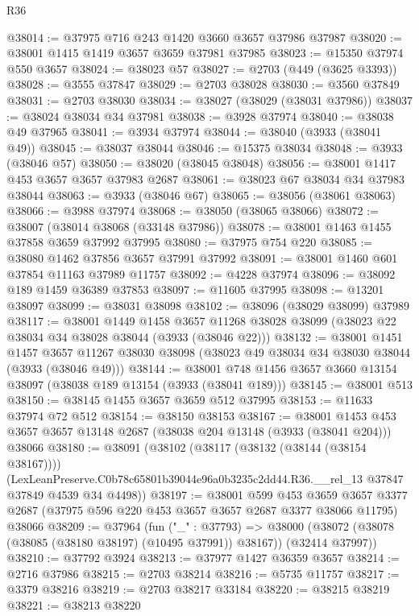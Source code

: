 \begin{lexlean}{R36}
\begin{coremodule}
@38014 := @37975 @716 @243 @1420 @3660 @3657 @37986 @37987
@38020 := @38001 @1415 @1419 @3657 @3659 @37981 @37985
@38023 := @15350 @37974 @550 @3657
@38024 := @38023 @57
@38027 := @2703 (@449 (@3625 @3393))
@38028 := @3555 @37847
@38029 := @2703 @38028
@38030 := @3560 @37849
@38031 := @2703 @38030
@38034 := @38027 (@38029 (@38031 @37986))
@38037 := @38024 @38034 @34 @37981
@38038 := @3928 @37974
@38040 := @38038 @49 @37965
@38041 := @3934 @37974
@38044 := @38040 (@3933 (@38041 @49))
@38045 := @38037 @38044
@38046 := @15375 @38034
@38048 := @3933 (@38046 @57)
@38050 := @38020 (@38045 @38048)
@38056 := @38001 @1417 @453 @3657 @3657 @37983 @2687
@38061 := @38023 @67 @38034 @34 @37983 @38044
@38063 := @3933 (@38046 @67)
@38065 := @38056 (@38061 @38063)
@38066 := @3988 @37974
@38068 := @38050 (@38065 @38066)
@38072 := @38007 (@38014 @38068 (@33148 @37986))
@38078 := @38001 @1463 @1455 @37858 @3659 @37992 @37995
@38080 := @37975 @754 @220
@38085 := @38080 @1462 @37856 @3657 @37991 @37992
@38091 := @38001 @1460 @601 @37854 @11163 @37989 @11757
@38092 := @4228 @37974
@38096 := @38092 @189 @1459 @36389 @37853
@38097 := @11605 @37995
@38098 := @13201 @38097
@38099 := @38031 @38098
@38102 := @38096 (@38029 @38099) @37989
@38117 := @38001
    @1449
    @1458
    @3657
    @11268
    @38028
    @38099
    (@38023 @22 @38034 @34 @38028 @38044 (@3933 (@38046 @22)))
@38132 := @38001
    @1451
    @1457
    @3657
    @11267
    @38030
    @38098
    (@38023 @49 @38034 @34 @38030 @38044 (@3933 (@38046 @49)))
@38144 := @38001 @748 @1456 @3657 @3660 @13154 @38097 (@38038 @189 @13154 (@3933 (@38041 @189)))
@38145 := @38001 @513
@38150 := @38145 @1455 @3657 @3659 @512 @37995
@38153 := @11633 @37974 @72 @512
@38154 := @38150 @38153
@38167 := @38001
    @1453
    @453
    @3657
    @3657
    @13148
    @2687
    (@38038 @204 @13148 (@3933 (@38041 @204)))
    @38066
@38180 := @38091
    (@38102
      (@38117 (@38132 (@38144 (@38154 @38167))))
      (LexLeanPreserve.C0b78c65801b39044e96a0b3235c2dd44.R36.__rel_13
        @37847
        @37849
        @4539
        @34
        @4498))
@38197 := @38001
    @599
    @453
    @3659
    @3657
    @3377
    @2687
    (@37975 @596 @220 @453 @3657 @3657 @2687 @3377 @38066 @11795)
    @38066
@38209 := @37964
    (fun ("_" : @37793) =>
    @38000 (@38072 (@38078 (@38085 (@38180 @38197) (@10495 @37991)) @38167)) (@32414 @37997))
@38210 := @37792 @3924
@38213 := @37977 @1427 @36359 @3657
@38214 := @2716 @37986
@38215 := @2703 @38214
@38216 := @5735 @11757
@38217 := @3379 @38216
@38219 := @2703 @38217 @33184
@38220 := @38215 @38219
@38221 := @38213 @38220

\end{coremodule}
\end{lexlean}
